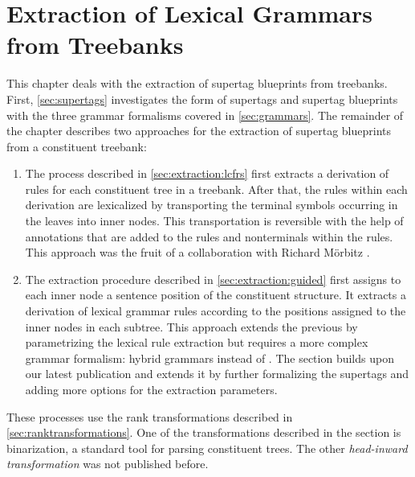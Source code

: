 \documentclass[../document.tex]{subfiles}
\begin{document}
    \chapter{Extraction of Lexical Grammars from Treebanks}\label{sec:extraction}
    This chapter deals with the extraction of supertag blueprints from treebanks.
    First, \cref{sec:supertags} investigates the form of supertags and supertag blueprints with the three grammar formalisms covered in \cref{sec:grammars}.
    The remainder of the chapter describes two approaches for the extraction of supertag blueprints from a constituent treebank:
    \begin{enumerate}
        \item
            The process described in \cref{sec:extraction:lcfrs} first extracts a derivation of  rules for each constituent tree in a treebank.
            After that, the rules within each derivation are lexicalized by transporting the terminal symbols occurring in the leaves into inner nodes.
            This transportation is reversible with the help of annotations that are added to the rules and nonterminals within the rules.
            This approach was the fruit of a collaboration with Richard Mörbitz \citep{MoeRup20,RupMoe21}.
        \item
            The extraction procedure described in \cref{sec:extraction:guided} first assigns to each inner node a sentence position of the constituent structure.
            It extracts a derivation of lexical grammar rules according to the positions assigned to the inner nodes in each subtree.
            This approach extends the previous by parametrizing the lexical rule extraction but requires a more complex grammar formalism: hybrid grammars instead of .
            The section builds upon our latest publication \citep{Rup22} and extends it by further formalizing the supertags and adding more options for the extraction parameters.
    \end{enumerate}
    These processes use the rank transformations described in \cref{sec:ranktransformations}.
    One of the transformations described in the section is binarization, a standard tool for parsing constituent trees.
    The other \emph{head-inward transformation} was not published before.

    
    
    
    

\end{document}

